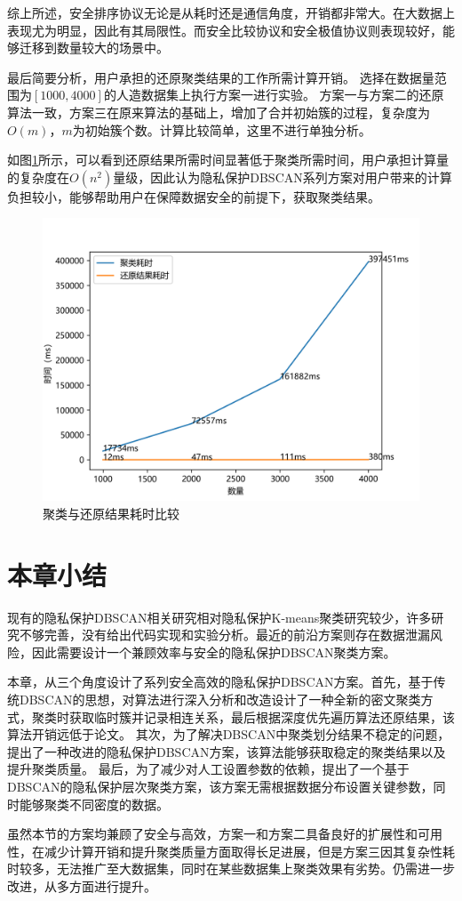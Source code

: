 综上所述，安全排序协议无论是从耗时还是通信角度，开销都非常大。在大数据上表现尤为明显，因此有其局限性。而安全比较协议和安全极值协议则表现较好，能够迁移到数量较大的场景中。

最后简要分析，用户承担的还原聚类结果的工作所需计算开销。
选择在数据量范围为$ [1000,4000] $的人造数据集上执行方案一进行实验。
方案一与方案二的还原算法一致，方案三在原来算法的基础上，增加了合并初始簇的过程，复杂度为$ O(m) $，$ m $为初始簇个数。计算比较简单，这里不进行单独分析。

如图\ref{s4-exp-recover}所示，可以看到还原结果所需时间显著低于聚类所需时间，用户承担计算量的复杂度在$ O(n^2) $量级，因此认为隐私保护DBSCAN系列方案对用户带来的计算负担较小，能够帮助用户在保障数据安全的前提下，获取聚类结果。
\begin{figure}[htbp]
	\centering
	\includegraphics[width=0.6\linewidth]{img/testrc.png}
	\caption{聚类与还原结果耗时比较}
	\label{s4-exp-recover}
\end{figure}

\section{本章小结}
\label{s4-xiaojie}
现有的隐私保护DBSCAN相关研究相对隐私保护K-means聚类研究较少，许多研究不够完善，没有给出代码实现和实验分析。最近的前沿方案\cite{bozdemir2021privacy}则存在数据泄漏风险，因此需要设计一个兼顾效率与安全的隐私保护DBSCAN聚类方案。

本章，从三个角度设计了系列安全高效的隐私保护DBSCAN方案。首先，基于传统DBSCAN的思想，对算法进行深入分析和改造设计了一种全新的密文聚类方式，聚类时获取临时簇并记录相连关系，最后根据深度优先遍历算法还原结果，该算法开销远低于论文\cite{bozdemir2021privacy}。
其次，为了解决DBSCAN中聚类划分结果不稳定的问题，提出了一种改进的隐私保护DBSCAN方案，该算法能够获取稳定的聚类结果以及提升聚类质量。
最后，为了减少对人工设置参数的依赖，提出了一个基于DBSCAN的隐私保护层次聚类方案，该方案无需根据数据分布设置关键参数，同时能够聚类不同密度的数据。

虽然本节的方案均兼顾了安全与高效，方案一和方案二具备良好的扩展性和可用性，在减少计算开销和提升聚类质量方面取得长足进展，但是方案三因其复杂性耗时较多，无法推广至大数据集，同时在某些数据集上聚类效果有劣势。仍需进一步改进，从多方面进行提升。